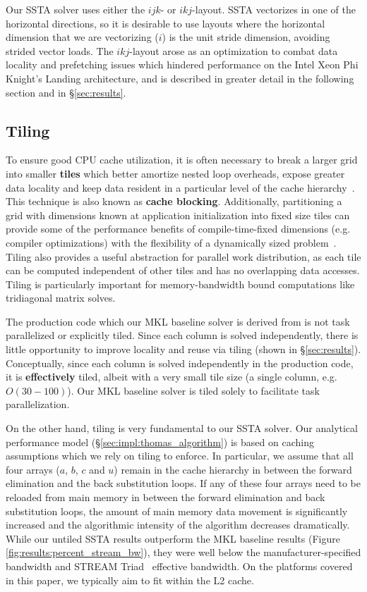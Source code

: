\documentclass{sig-alternate}
\begin{document}
Our SSTA solver uses either the \(ijk\)- or \(ikj\)-layout.
SSTA vectorizes in one of the horizontal directions, so it is
  desirable to use layouts where the horizontal dimension that we are
  vectorizing (\(i\)) is the unit stride dimension, avoiding strided vector loads.
The \(ikj\)-layout arose as an optimization to combat data locality and
  prefetching issues which hindered performance on the Intel Xeon Phi Knight's
  Landing architecture, and is described in greater detail in the following
  section and in \S\ref{sec:results}.

\subsection{Tiling}
\label{sec:impl:tiling}

To ensure good CPU cache utilization, it is often necessary to break a larger
  grid into smaller \textbf{tiles} which better amortize nested loop overheads, expose
  greater data locality and keep data resident in a particular level of the
  cache hierarchy~\cite{cache_blocking}.
This technique is also known as \textbf{cache blocking}.
Additionally, partitioning a grid with dimensions known at application
  initialization into fixed size tiles can provide some of the performance
  benefits of compile-time-fixed dimensions (e.g. compiler optimizations) with
  the flexibility of a dynamically sized problem~\cite{kokkos}.
Tiling also provides a useful abstraction for parallel work distribution, as
  each tile can be computed independent of other tiles and has no overlapping
  data accesses.
Tiling is particularly important for memory-bandwidth bound computations like
  tridiagonal matrix solves.

The production code which our MKL baseline solver is derived from is not task
  parallelized or explicitly tiled.
Since each column is solved independently, there is little opportunity to improve
  locality and reuse via tiling (shown in \S\ref{sec:results}).
Conceptually, since each column is solved independently in the production code,
  it is \textbf{effectively} tiled, albeit with a very small tile size (a single
  column, e.g. \(O(30-100)\)).
Our MKL baseline solver is tiled solely to facilitate task parallelization.

On the other hand, tiling is very fundamental to our SSTA solver.
Our analytical performance model (\S\ref{sec:impl:thomas_algorithm})
  is based on caching assumptions which we rely on tiling to enforce.
In particular, we assume that all four arrays (\(a\), \(b\), \(c\) and \(u\))
  remain in the cache hierarchy in between the forward elimination and the
  back substitution loops.
If any of these four arrays need to be reloaded from main memory in between the
  forward elimination and back substitution loops, the amount of main memory data
  movement is significantly increased and the algorithmic intensity of the
  algorithm decreases dramatically.
While our untiled SSTA results outperform the MKL baseline results (Figure
  \ref{fig:results:percent_stream_bw}), they were well below the manufacturer-specified
  bandwidth and STREAM Triad~\cite{stream} effective bandwidth.
On the platforms covered in this paper, we typically aim to fit within the L2
  cache.
\end{document}
